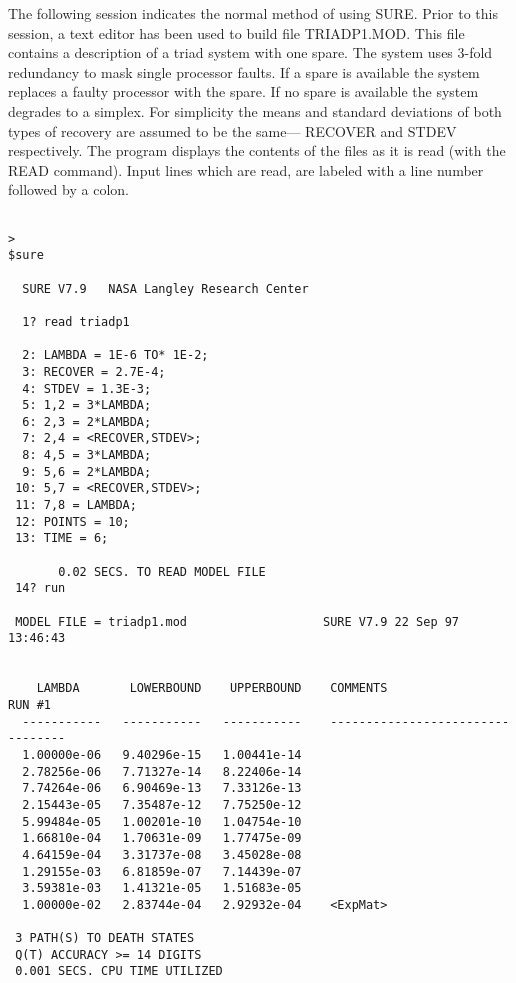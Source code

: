 The following session indicates the normal method of using SURE.  Prior to
this session, a text editor has been used to build file {\isf TRIADP1.MOD}.
This file contains a description of a triad system with one spare.  The system
uses 3-fold redundancy to mask single processor faults.  If a spare is
available the system replaces a faulty processor with the spare.  If no spare
is available the system degrades to a simplex.  For simplicity the means and
standard deviations of both types of recovery are assumed to be the same---
{\isf RECOVER} and {\isf STDEV} respectively.  The program displays the
contents of the files as it is read (with the {\isf READ} command).  Input
lines which are read, are labeled with a line number followed by a colon.
\begin{verbatim}

> 
$sure

  SURE V7.9   NASA Langley Research Center

  1? read triadp1

  2: LAMBDA = 1E-6 TO* 1E-2;   
  3: RECOVER = 2.7E-4;
  4: STDEV = 1.3E-3;
  5: 1,2 = 3*LAMBDA;
  6: 2,3 = 2*LAMBDA;
  7: 2,4 = <RECOVER,STDEV>;
  8: 4,5 = 3*LAMBDA;
  9: 5,6 = 2*LAMBDA;
 10: 5,7 = <RECOVER,STDEV>;
 11: 7,8 = LAMBDA;
 12: POINTS = 10;
 13: TIME = 6;

       0.02 SECS. TO READ MODEL FILE
 14? run

 MODEL FILE = triadp1.mod                   SURE V7.9 22 Sep 97  13:46:43


    LAMBDA       LOWERBOUND    UPPERBOUND    COMMENTS                 RUN #1
  -----------   -----------   -----------    ---------------------------------
  1.00000e-06   9.40296e-15   1.00441e-14
  2.78256e-06   7.71327e-14   8.22406e-14
  7.74264e-06   6.90469e-13   7.33126e-13
  2.15443e-05   7.35487e-12   7.75250e-12
  5.99484e-05   1.00201e-10   1.04754e-10
  1.66810e-04   1.70631e-09   1.77475e-09
  4.64159e-04   3.31737e-08   3.45028e-08
  1.29155e-03   6.81859e-07   7.14439e-07
  3.59381e-03   1.41321e-05   1.51683e-05
  1.00000e-02   2.83744e-04   2.92932e-04    <ExpMat>

 3 PATH(S) TO DEATH STATES
 Q(T) ACCURACY >= 14 DIGITS
 0.001 SECS. CPU TIME UTILIZED
\end{verbatim}


